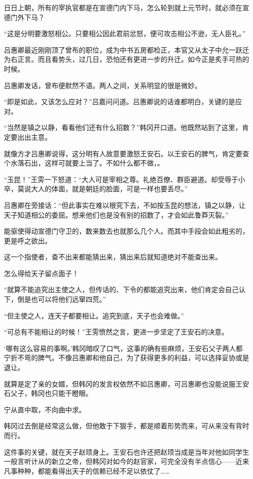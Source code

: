 日日上朝，所有的宰执官都是在宣德门内下马，怎么轮到就上元节时，就必须在宣德门外下马？

“这是分明要激怒相公。只要相公因此君前忿怒，便可攻击相公不逊，无人臣礼。”

吕惠卿最近刚刚顶了曾布的职位，成为中书五房都检正，本官又从太子中允一跃迁为右正言。而且看势头，过几日，恐怕还有更进一步的升迁。如今正是炙手可热的时候。

吕惠卿发话，曾布便默然不语。两人之间，关系明显的很是微妙。

“即是如此，又该怎么应对？”吕嘉问问道。吕惠卿说的话谁都明白，关键的是应对。

“当然是镇之以静，看看他们还有什么招数？”韩冈开口道。他既然站到了这里，肯定要出出主意。

就像方才吕惠卿说得，这分明有人故意要激怒王安石。以王安石的脾气，肯定要查个水落石出，这样可就要上当了。不如什么都不做，。

“玉昆！”王雱一下怒道：“大人可是宰相之尊。礼绝百僚、群臣避道。却受辱于小卒，莫说大人的体面，就是朝廷的脸面，可是一样也要丢尽。”

吕惠卿在旁接话：“但此事实在难以根究下去，不如按玉昆的想法，镇之以静，让天子知道相公的委屈。想来他们也是没有别的招数了，才会如此鲁莽灭裂。”

能驱使得动宣德门守卫的，数来数去也就那么几个人。而其中手段会如此粗劣的，更是呼之欲出。

这一个指使者，查不出来都能猜出来，猜出来后就知道绝对不能查出来。

怎么得给天子留点面子！

“就算不能追究出主使之人，但传话的、下令的都能追究出来，他们肯定会自己认下，倒是也可以将他们远窜四荒。”

“但主使之人，连天子都要相让。追究到底，天子也会难做。”

“可总有不能相让的时候！”王雱愤然之言，更进一步坚定了王安石的决意。

‘哪有这么容易的事啊。’韩冈暗叹了口气，这事的确有些麻烦，王安石父子两人都宁折不弯的脾气。不像吕惠卿和他自己，为了获得更多的利益，可以选择妥协或是退让。

就算是定了亲的女婿，但韩冈的发言权依然不如吕惠卿，可吕惠卿也没能说服王安石父子，韩冈也只能干瞪眼。

宁从直中取，不向曲中求。

韩冈过去倒是经常这么做，但他敢于下狠手，都是顺着形势而来，可从来没有背时而行。

这件事的关键，就在天子赵顼身上。王安石也许还把赵顼当成是当年对他如同学生一般言听计从的新立之帝，但韩冈对如今的赵官家，可完全没有半点信心——近来凡事种种，都能看得出天子的信赖已经不足以依仗了……

